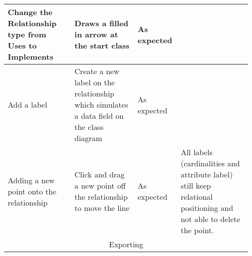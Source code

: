 \begin{landscape}
\begin{tabular}{| p{3cm} | p{7cm} | p{7cm} | p{8cm} |}
	Change the Relationship type from Uses to Implements  & Draws a filled in arrow at the start class & As expected & \\ \hline

	Add a label & Create a new label on the relationship which simulates a data field on the class diagram & As expected & \\ \hline

	Adding a new point onto the relationship & Click and drag a new point off the relationship to move the line & As expected & All labels (cardinalities and attribute label) still keep relational positioning and not able to delete the point. \\ \hline

	\multicolumn{4}{|c|}{Exporting} \\ \hline


\end{tabular}

 \end{landscape}
\newpage




